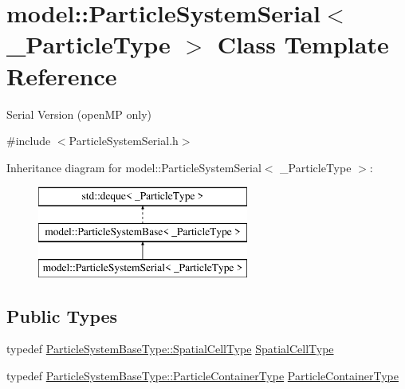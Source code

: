 \hypertarget{classmodel_1_1_particle_system_serial}{}\section{model\+:\+:Particle\+System\+Serial$<$ \+\_\+\+Particle\+Type $>$ Class Template Reference}
\label{classmodel_1_1_particle_system_serial}


Serial Version (open\+M\+P only)  




{\ttfamily \#include $<$Particle\+System\+Serial.\+h$>$}

Inheritance diagram for model\+:\+:Particle\+System\+Serial$<$ \+\_\+\+Particle\+Type $>$\+:\begin{figure}[H]
\begin{center}
\leavevmode
\includegraphics[height=3.000000cm]{classmodel_1_1_particle_system_serial}
\end{center}
\end{figure}
\subsection*{Public Types}
\begin{DoxyCompactItemize}
\item 
typedef \hyperlink{classmodel_1_1_particle_system_base_a8de0382d851a8968d757f91bad3a408e}{Particle\+System\+Base\+Type\+::\+Spatial\+Cell\+Type} \hyperlink{classmodel_1_1_particle_system_serial_ad5979cd0b17a34b3731e4fe505dc86df}{Spatial\+Cell\+Type}
\item 
typedef \hyperlink{classmodel_1_1_particle_system_base_ac95d9a819d1da5e86f726494bf6df504}{Particle\+System\+Base\+Type\+::\+Particle\+Container\+Type} \hyperlink{classmodel_1_1_particle_system_serial_a9f62b7a84c09fb9b7a6297630c3a5e6d}{Particle\+Container\+Type}
\end{DoxyCompactItemize}
